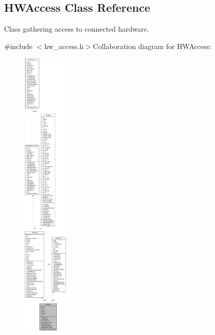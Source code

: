 \hypertarget{class_h_w_access}{
\subsection{HWAccess Class Reference}
\label{class_h_w_access}
}


Class gathering access to connected hardware.  


{\ttfamily \#include $<$hw\_\-access.h$>$}Collaboration diagram for HWAccess:\nopagebreak
\begin{figure}[H]
\begin{center}
\leavevmode
\includegraphics[height=400pt]{class_h_w_access__coll__graph}
\end{center}
\end{figure}
